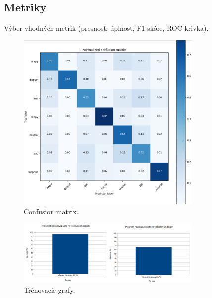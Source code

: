 \begin{itemize}
\subsection{Metriky} Výber vhodných metrik (presnosť, úplnosť, F1-skóre, ROC krivka).
\begin{figure}[!htpb]
    \centering
    \includegraphics[width=0.8\textwidth]{img/confusion.png}
    \caption{Confusion matrix.}
    \label{fig:confusion}
\end{figure}
\begin{figure}[!htpb]
    \centering
    \includegraphics[width=0.8\textwidth]{img/train_graphs.png}
    \caption{Trénovacie grafy.}
    \label{fig:roc}
\end{figure}
\newpage


\end{itemize}
